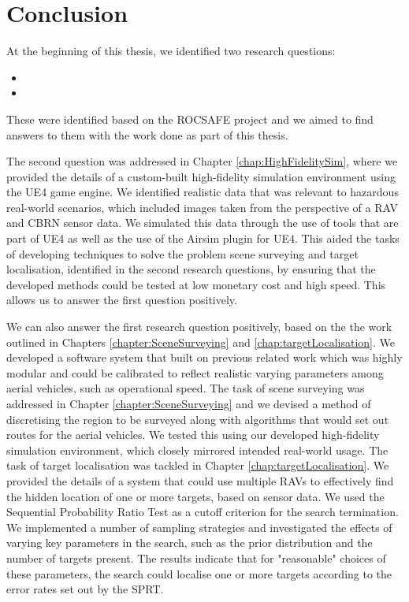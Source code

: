 
\chapter{Conclusion}
At the beginning of this thesis, we identified two research questions: 
\begin{itemize}
    \item  
    \item 
\end{itemize}
These were identified based on the ROCSAFE project and we aimed to find answers to them with the work done as part of this thesis.

\par The second question was addressed in Chapter \ref{chap:HighFidelitySim}, where we provided the details of a custom-built high-fidelity simulation environment using the UE4 game engine. We identified realistic data that was relevant to hazardous real-world scenarios, which included images taken from the perspective of a RAV and CBRN sensor data. We simulated this data through the use of tools that are part of UE4 as well as the use of the Airsim \cite{Shah2017AirSim:Vehicles} plugin for UE4. This aided the tasks of developing techniques to solve the problem scene surveying and target localisation, identified in the second research questions, by ensuring that the developed methods could be tested at low monetary cost and high speed. This allows us to answer the first question positively.

\par We can also answer the first research question positively, based on the the work outlined in Chapters \ref{chapter:SceneSurveying} and \ref{chap:targetLocalisation}. We developed a software system that built on previous related work which was highly modular and could be calibrated to reflect realistic varying parameters among aerial vehicles, such as operational speed. The task of scene surveying was addressed in Chapter \ref{chapter:SceneSurveying} and we devised a method of discretising the region to be surveyed along with algorithms that would set out routes for the aerial vehicles. We tested this using our developed high-fidelity simulation environment, which closely mirrored intended real-world usage. The task of target localisation was tackled in Chapter \ref{chap:targetLocalisation}. We provided the details of a system that could use multiple RAVs to effectively find the hidden location of one or more targets, based on sensor data. We used the Sequential Probability Ratio Test as a cutoff criterion for the search termination. We implemented a number of sampling strategies and investigated the effects of varying key parameters in the search, such as the prior distribution and the number of targets present. The results indicate that for "reasonable" choices of these parameters, the search could localise one or more targets according to the error rates set out by the SPRT. 
